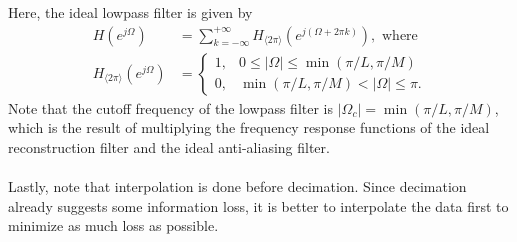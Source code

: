 \documentclass{report}
\begin{document}
\begin{center}
\end{center}
Here, the ideal lowpass filter is given by
\begin{align}
    H(e^{j\Omega}) &= \sum_{k=-\infty}^{+\infty} H_{\langle 2\pi\rangle}(e^{j(\Omega+2\pi k)}), \text{ where } \\
    H_{\langle 2\pi\rangle}(e^{j\Omega}) &= 
    \begin{cases}
        1, & 0\leq|\Omega|\leq\min(\pi/L,\pi/M) \\
        0, & \min(\pi/L,\pi/M)<|\Omega|\leq\pi.
    \end{cases}
\end{align}
Note that the cutoff frequency of the lowpass filter is $|\Omega_c|=\min(\pi/L,\pi/M)$, which is the result of 
multiplying the frequency response functions of the ideal reconstruction filter and the ideal anti-aliasing filter.
\\ \\
Lastly, note that interpolation is done before decimation. Since decimation already suggests some information loss, it is 
better to interpolate the data first to minimize as much loss as possible.
\end{document}
